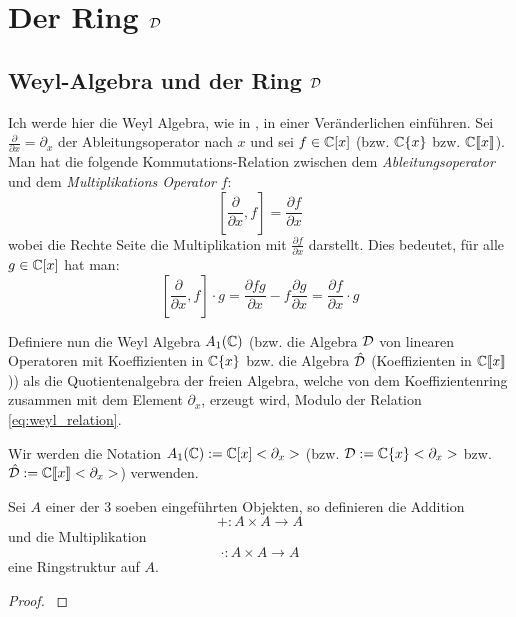 
\chapter{Der Ring $\mathcal{D}$}

\section{Weyl-Algebra und der Ring $\mathcal{D}$} 
Ich werde hier die Weyl Algebra, wie in
\cite[Chapter~1]{sabbah_cimpa90}, in einer Veränderlichen einführen.
Sei $\frac{\partial}{\partial x}=\partial_x$ der Ableitungsoperator nach $x$
und sei $f \in\mathbb{C}[x]$ (bzw. $\mathbb{C}\{x\}$ bzw. $\mathbb{C}\llbracket x\rrbracket$).
Man hat die folgende Kommutations-Relation zwischen dem
\emph{Ableitungsoperator}
und dem \emph{Multiplikations Operator} $f$:
\begin{equation}\label{eq:weyl_relation}
[\frac{\partial}{\partial x},f]=\frac{\partial f}{\partial x}
\end{equation}
wobei die Rechte Seite die Multiplikation mit $\frac{\partial f}{\partial x}$
darstellt. Dies bedeutet, für alle $g\in\mathbb{C}[x]$ hat man:
\[
[\frac{\partial}{\partial x},f]\cdot g
=\frac{\partial fg}{\partial x} - f\frac{\partial g}{\partial x}
=\frac{\partial f}{\partial x} \cdot g
\]
\begin{defn}
Definiere nun die Weyl Algebra $A_1(\mathbb{C})$ (bzw. die Algebra $\mathcal{D}$ von
linearen Operatoren mit Koeffizienten in $\mathbb{C}\{x\}$ bzw. die Algebra
$\hat{\mathcal{D}}$ (Koeffizienten in $\mathbb{C}\llbracket x\rrbracket$)) als die
Quotientenalgebra der freien Algebra, welche von dem Koeffizientenring
zusammen mit dem Element $\partial_x$, erzeugt wird, Modulo der Relation
\eqref{eq:weyl_relation}.
\end{defn}
Wir werden die Notation $A_1(\mathbb{C}):=\mathbb{C}[x]<\partial_x>$ (bzw.
$\mathcal{D}:=\mathbb{C}\{x\}<\partial_x>$ bzw. 
$\hat{\mathcal{D}}:=\mathbb{C}\llbracket x\rrbracket<\partial_x>$) verwenden.

\begin{comment}
Beispiele und Alternative Definition:\\
Sergey-Arkhipov-MAT1191\_Lecture\_Notes.pdf Chapter 2.1
\end{comment}

\begin{lem} %
Sei $A$ einer der 3 soeben eingeführten Objekten, so definieren die Addition 
\[ +:A\times A \rightarrow A \]
und die Multiplikation
\[ \cdot:A\times A \rightarrow A \]
eine Ringstruktur auf $A$.
\end{lem}
\begin{proof}
\cite[Kapittel 2 Section 1]{ZulaBarbara}
\end{proof}

